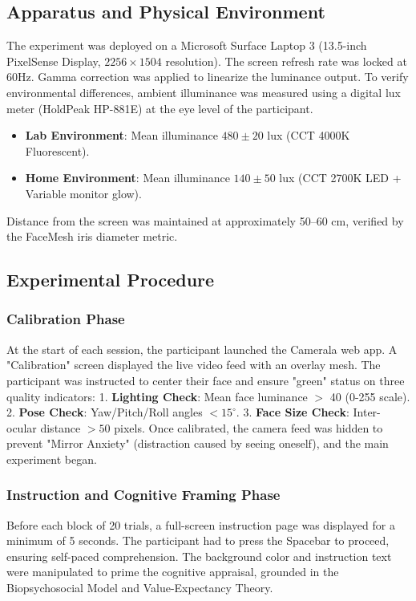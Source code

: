 \documentclass[journal]{IEEEtran}
\begin{document}
\subsection{Apparatus and Physical Environment}
The experiment was deployed on a Microsoft Surface Laptop 3 (13.5-inch PixelSense Display, $2256 \times 1504$ resolution).
The screen refresh rate was locked at 60Hz. Gamma correction was applied to linearize the luminance output.
To verify environmental differences, ambient illuminance was measured using a digital lux meter (HoldPeak HP-881E) at the eye level of the participant.
\begin{itemize}
    \item \textbf{Lab Environment}: Mean illuminance $480 \pm 20$ lux (CCT 4000K Fluorescent).
    \item \textbf{Home Environment}: Mean illuminance $140 \pm 50$ lux (CCT 2700K LED + Variable monitor glow).
\end{itemize}
Distance from the screen was maintained at approximately 50--60 cm, verified by the FaceMesh iris diameter metric.

\subsection{Experimental Procedure}
\subsubsection{Calibration Phase}
At the start of each session, the participant launched the Camerala web app. A "Calibration" screen displayed the live video feed with an overlay mesh.
The participant was instructed to center their face and ensure "green" status on three quality indicators:
1. \textbf{Lighting Check}: Mean face luminance $>$ 40 (0-255 scale).
2. \textbf{Pose Check}: Yaw/Pitch/Roll angles  $< 15^\circ$.
3. \textbf{Face Size Check}: Inter-ocular distance $> 50$ pixels.
Once calibrated, the camera feed was hidden to prevent "Mirror Anxiety" (distraction caused by seeing oneself), and the main experiment began.

\subsubsection{Instruction and Cognitive Framing Phase}
Before each block of 20 trials, a full-screen instruction page was displayed for a minimum of 5 seconds.
The participant had to press the Spacebar to proceed, ensuring self-paced comprehension.
The background color and instruction text were manipulated to prime the cognitive appraisal, grounded in the Biopsychosocial Model and Value-Expectancy Theory.
\end{document}

